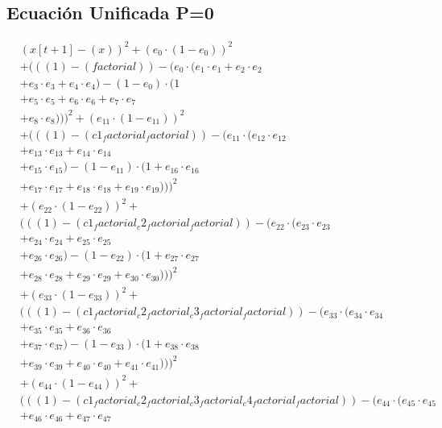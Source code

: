 \documentclass[10pt, a4paper]{article}
\begin{document}
\subsection*{Ecuación Unificada P=0}
\begin{align*}
& (x[t+1] - (x))^{2} + (e_{0} \cdot (1 - e_{0}))^{2} \\
& + (((1) - (factorial)) - (e_{0} \cdot (e_{1} \cdot e_{1} + e_{2} \cdot e_{2} \\
& + e_{3} \cdot e_{3} + e_{4} \cdot e_{4}) - (1 - e_{0}) \cdot (1 \\
& + e_{5} \cdot e_{5} + e_{6} \cdot e_{6} + e_{7} \cdot e_{7} \\
& + e_{8} \cdot e_{8})))^{2} + (e_{11} \cdot (1 - e_{11}))^{2} \\
& + (((1) - (c1_factorial_factorial)) - (e_{11} \cdot (e_{12} \cdot e_{12} \\
& + e_{13} \cdot e_{13} + e_{14} \cdot e_{14} \\
& + e_{15} \cdot e_{15}) - (1 - e_{11}) \cdot (1 + e_{16} \cdot e_{16} \\
& + e_{17} \cdot e_{17} + e_{18} \cdot e_{18} + e_{19} \cdot e_{19})))^{2} \\
& + (e_{22} \cdot (1 - e_{22}))^{2} + \\
& (((1) - (c1_factorial_c2_factorial_factorial)) - (e_{22} \cdot (e_{23} \cdot e_{23} \\
& + e_{24} \cdot e_{24} + e_{25} \cdot e_{25} \\
& + e_{26} \cdot e_{26}) - (1 - e_{22}) \cdot (1 + e_{27} \cdot e_{27} \\
& + e_{28} \cdot e_{28} + e_{29} \cdot e_{29} + e_{30} \cdot e_{30})))^{2} \\
& + (e_{33} \cdot (1 - e_{33}))^{2} + \\
& (((1) - (c1_factorial_c2_factorial_c3_factorial_factorial)) - (e_{33} \cdot (e_{34} \cdot e_{34} \\
& + e_{35} \cdot e_{35} + e_{36} \cdot e_{36} \\
& + e_{37} \cdot e_{37}) - (1 - e_{33}) \cdot (1 + e_{38} \cdot e_{38} \\
& + e_{39} \cdot e_{39} + e_{40} \cdot e_{40} + e_{41} \cdot e_{41})))^{2} \\
& + (e_{44} \cdot (1 - e_{44}))^{2} + \\
& (((1) - (c1_factorial_c2_factorial_c3_factorial_c4_factorial_factorial)) - (e_{44} \cdot (e_{45} \cdot e_{45} \\
& + e_{46} \cdot e_{46} + e_{47} \cdot e_{47} \\

\end{align*}
\end{document}
